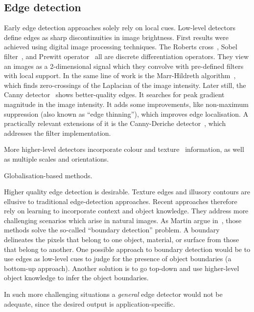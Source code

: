 \subsection{Edge detection}
Early edge detection approaches solely rely on local cues. Low-level detectors define edges as sharp discontinuities in image brightness. First results were achieved using digital image processing techniques. The Roberts cross~\cite{roberts1963machine}, Sobel filter~\cite{sobel19683x3}, and Prewitt operator~\cite{prewitt1970object} all are discrete differentiation operators. %
They view an images as a 2-dimensional signal which they convolve with pre-defined filters with local support. In the same line of work is the Marr-Hildreth algorithm~\cite{marr1980theory}, which finds zero-crossings of the Laplacian of the image intensity. Later still, the Canny detector~\cite{canny1986computational} shows better-quality edges. It searches for peak gradient magnitude in the image intensity. It adds some improvements, like non-maximum suppression (also known as ``edge thinning''), which improves edge localisation. A practically relevant extensions of it is the Canny-Deriche detector~\cite{deriche1987using}, which addresses the filter implementation.

More higher-level detectors incorporate colour and texture~\cite{rubner1996coalescing,will2000learning} information, as well as multiple scales and orientations.

Globalisation-based methods.

Higher quality edge detection is desirable. Texture edges and illusory contours are ellusive to %
traditional edge-detection approaches. Recent approaches therefore rely on learning to incorporate context and object knowledge. They address more challenging scenarios which arise in natural images. As Martin \etal argue in~\cite{martin2004learning}, those methods solve the so-called ``boundary detection'' problem. A boundary delineates the pixels that belong to one object, material, or surface from those that belong to another. One possible approach to boundary detection would be to use edges as low-level cues to judge for the presence of object boundaries (a bottom-up approach). Another solution is to go top-down and use higher-level object knowledge to infer the object boundaries.

In such more challenging situations a \textit{general} edge detector would not be adequate, since the desired output is application-specific.

